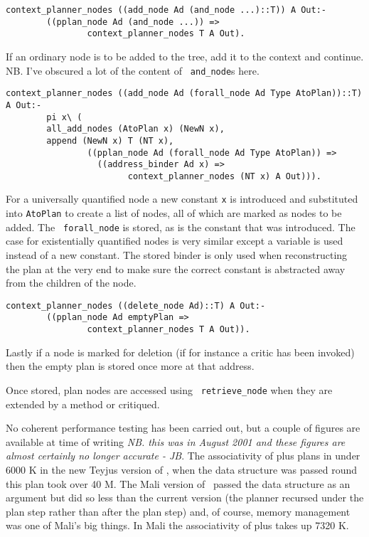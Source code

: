 \begin{verbatim}
context_planner_nodes ((add_node Ad (and_node ...)::T)) A Out:-
        ((pplan_node Ad (and_node ...)) => 
                context_planner_nodes T A Out).
\end{verbatim}
If an ordinary node is to be added to the tree, add it to the context
and continue.  NB.  I've obscured a lot of the content of {\tt
  and\_node}s here.

\begin{verbatim}
context_planner_nodes ((add_node Ad (forall_node Ad Type AtoPlan))::T) A Out:-
        pi x\ (
        all_add_nodes (AtoPlan x) (NewN x),
        append (NewN x) T (NT x),
                ((pplan_node Ad (forall_node Ad Type AtoPlan)) => 
                  ((address_binder Ad x) =>
                        context_planner_nodes (NT x) A Out))).
\end{verbatim}

For a universally quantified node a new constant {\tt x} is introduced
and substituted into {\tt AtoPlan} to create a list of nodes, all of
which are marked as nodes to be added.  The {\tt
  forall\_node} is stored, as is the constant that
was introduced.  The case for existentially quantified nodes is very
similar except a variable is used instead of a new constant.  The
stored binder is only used when reconstructing the plan at the very
end to make sure the correct constant is abstracted away from the
children of the node.

\begin{verbatim}
context_planner_nodes ((delete_node Ad)::T) A Out:-
        ((pplan_node Ad emptyPlan =>
                context_planner_nodes T A Out)).
\end{verbatim}
Lastly if a node is marked for deletion (if for instance a critic has
been invoked) then the empty plan is stored once more at that address.

Once stored, plan nodes are accessed using {\tt
  retrieve\_node} when they are extended by a
method or critiqued.


No coherent performance testing has been carried out, but a couple of
figures are available at time of writing {\em NB. this was in August
  2001 and these figures are almost certainly no longer accurate -
  JB}.  The associativity of plus plans
in under 6000 K in the new Teyjus version of \lclam, when the data
structure was passed round this plan took over 40 M.  The Mali version
of \lclam\ passed the data structure as an argument but did so less
than the current version (the planner recursed under the plan step
rather than after the plan step) and, of course, memory management was
one of Mali's big things.  In Mali the associativity of plus takes up
7320 K.

